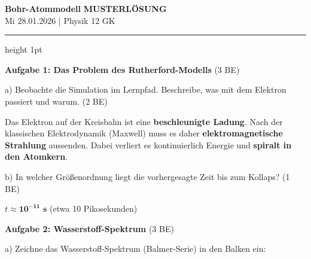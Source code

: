 \documentclass[11pt,a4paper]{article}
\begin{document}
\begin{minipage}[t]{0.65\textwidth}
\vspace{0pt}
{\Large\textbf{Bohr-Atommodell}} \hfill \textcolor{loesung}{\textbf{MUSTERLÖSUNG}}\\[0.3em]
{\normalsize Mi 28.01.2026 | Physik 12 GK}
\end{minipage}

\vspace{0.3em}
\hrule height 1pt
\vspace{0.6em}


\textbf{Aufgabe 1: Das Problem des Rutherford-Modells} \hfill (3 BE)

\vspace{0.3em}

a) Beobachte die Simulation im Lernpfad. Beschreibe, was mit dem Elektron passiert und warum. (2 BE)

\begin{tcolorbox}[loesungbox]
Das Elektron auf der Kreisbahn ist eine \textbf{beschleunigte Ladung}. Nach der klassischen Elektrodynamik (Maxwell) muss es daher \textbf{elektromagnetische Strahlung} aussenden. Dabei verliert es kontinuierlich Energie und \textbf{spiralt in den Atomkern}.
\end{tcolorbox}

b) In welcher Größenordnung liegt die vorhergesagte Zeit bis zum Kollaps? (1 BE)

\begin{tcolorbox}[loesungbox]
$t \approx \mathbf{10^{-11} \text{ s}}$ (etwa 10 Pikosekunden)
\end{tcolorbox}

\vspace{0.5em}


\textbf{Aufgabe 2: Wasserstoff-Spektrum} \hfill (3 BE)

\vspace{0.3em}

a) Zeichne das Wasserstoff-Spektrum (Balmer-Serie) in den Balken ein:

\vspace{0.3em}
\end{document}
